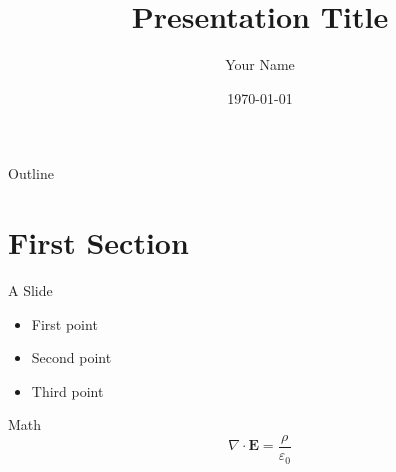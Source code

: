 \documentclass{beamer}
\title{Presentation Title}
\author{Your Name}
\date{\today}
\begin{document}
\begin{frame}
  \titlepage
\end{frame}

\begin{frame}{Outline}
  \tableofcontents
\end{frame}

\section{First Section}

\begin{frame}{A Slide}
  \begin{itemize}
    \item First point
    \item Second point
    \item Third point
  \end{itemize}
\end{frame}

\begin{frame}{Math}
  \begin{equation*}
    \nabla \cdot \mathbf{E} = \frac{\rho}{\varepsilon_0}
  \end{equation*}
\end{frame}
\end{document}
